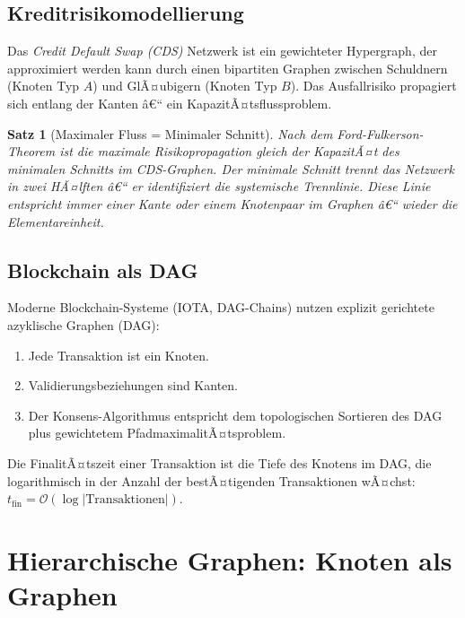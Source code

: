﻿\documentclass[12pt,a4paper,twoside]{article}
\theoremstyle{definition}
\theoremstyle{plain}
\newtheorem{theorem}{Satz}[section]
\theoremstyle{remark}
\begin{document}
\subsection{Kreditrisikomodellierung}

Das \emph{Credit Default Swap (CDS)} Netzwerk ist ein
gewichteter Hypergraph, der approximiert werden kann durch
einen bipartiten Graphen zwischen Schuldnern (Knoten
Typ $A$) und GlÃ¤ubigern (Knoten Typ $B$).  Das Ausfallrisiko
propagiert sich entlang der Kanten â€“ ein KapazitÃ¤tsflussproblem.

\begin{theorem}[Maximaler Fluss = Minimaler Schnitt]
Nach dem Ford-Fulkerson-Theorem ist die maximale
Risikopropagation gleich der KapazitÃ¤t des minimalen
Schnitts im CDS-Graphen.  Der minimale Schnitt trennt
das Netzwerk in zwei HÃ¤lften â€“ er identifiziert die
\emph{systemische Trennlinie}.  Diese Linie entspricht
immer einer Kante oder einem Knotenpaar im Graphen â€“
wieder die Elementareinheit.
\end{theorem}

\subsection{Blockchain als DAG}

Moderne Blockchain-Systeme (IOTA, DAG-Chains) nutzen explizit
gerichtete azyklische Graphen (DAG):
\begin{enumerate}
  \item Jede Transaktion ist ein Knoten.
  \item Validierungsbeziehungen sind Kanten.
  \item Der Konsens-Algorithmus entspricht dem
        topologischen Sortieren des DAG plus gewichtetem
        PfadmaximalitÃ¤tsproblem.
\end{enumerate}
Die FinalitÃ¤tszeit einer Transaktion ist die Tiefe des
Knotens im DAG, die logarithmisch in der Anzahl der
bestÃ¤tigenden Transaktionen wÃ¤chst: $t_{\text{fin}} =
\mathcal{O}(\log |\text{Transaktionen}|)$.

\section{Hierarchische Graphen: Knoten als Graphen}
\label{sec:hierarchie}

\end{document}
